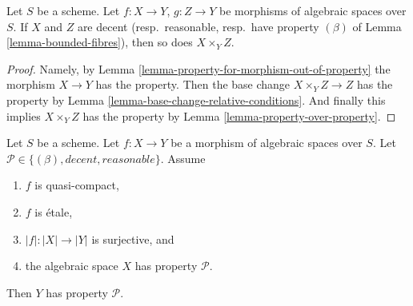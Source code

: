 \begin{lemma}
\label{lemma-fibre-product-conditions}
Let $S$ be a scheme. Let $f : X \to Y$, $g : Z \to Y$ be morphisms
of algebraic spaces over $S$. If $X$ and $Z$ are decent
(resp.\ reasonable, resp.\ have property 
$(\beta)$ of Lemma \ref{lemma-bounded-fibres}), then so does $X \times_Y Z$.
\end{lemma}

\begin{proof}
Namely, by Lemma \ref{lemma-property-for-morphism-out-of-property}
the morphism $X \to Y$ has the property. Then the base change
$X \times_Y Z \to Z$ has the property by
Lemma \ref{lemma-base-change-relative-conditions}.
And finally this implies $X \times_Y Z$ has the
property by Lemma \ref{lemma-property-over-property}.
\end{proof}

\begin{lemma}
\label{lemma-descent-conditions}
Let $S$ be a scheme.
Let $f : X \to Y$ be a morphism of algebraic spaces over $S$.
Let $\mathcal{P} \in \{(\beta), decent, reasonable\}$.
Assume
\begin{enumerate}
\item $f$ is quasi-compact,
\item $f$ is \'etale,
\item $|f| : |X| \to |Y|$ is surjective, and
\item the algebraic space $X$ has property $\mathcal{P}$.
\end{enumerate}
Then $Y$ has property $\mathcal{P}$.
\end{lemma}


